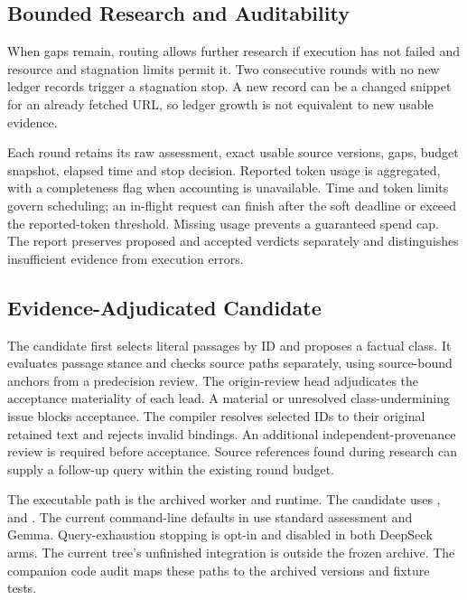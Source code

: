 \documentclass[conference]{IEEEtran}
\begin{document}
\subsection{Bounded Research and Auditability}
When gaps remain, routing allows further research if execution has not failed and resource and stagnation limits permit it. Two consecutive rounds with no new ledger records trigger a stagnation stop. A new record can be a changed snippet for an already fetched URL, so ledger growth is not equivalent to new usable evidence.

Each round retains its raw assessment, exact usable source versions, gaps, budget snapshot, elapsed time and stop decision. Reported token usage is aggregated, with a completeness flag when accounting is unavailable. Time and token limits govern scheduling; an in-flight request can finish after the soft deadline or exceed the reported-token threshold. Missing usage prevents a guaranteed spend cap. The report preserves proposed and accepted verdicts separately and distinguishes insufficient evidence from execution errors.

\subsection{Evidence-Adjudicated Candidate}
The candidate first selects literal passages by ID and proposes a factual class. It evaluates passage stance and checks source paths separately, using source-bound anchors from a predecision review. The origin-review head adjudicates the acceptance materiality of each lead. A material or unresolved class-undermining issue blocks acceptance. The compiler resolves selected IDs to their original retained text and rejects invalid bindings. An additional independent-provenance review is required before acceptance. Source references found during research can supply a follow-up query within the existing round budget.

The executable path is the archived  worker and  runtime. The candidate uses ,  and . The current command-line defaults in  use standard assessment and Gemma. Query-exhaustion stopping is opt-in and disabled in both DeepSeek arms. The current tree's unfinished  integration is outside the frozen archive. The companion code audit maps these paths to the archived versions and fixture tests.
\end{document}
